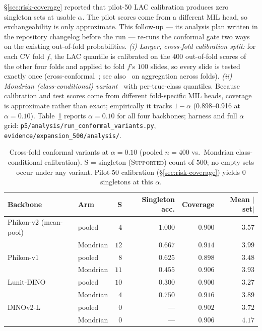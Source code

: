 \documentclass{article}
\newcommand{\SafeNum}[1]{#1}
\begin{document}
\S\ref{sec:risk-coverage} reported that pilot-50 LAC calibration produces zero singleton sets at usable $\alpha$. The pilot scores come from a different MIL head, so exchangeability is only approximate. This follow-up --- its analysis plan written in the repository changelog before the run --- re-runs the conformal gate two ways on the existing out-of-fold probabilities. \emph{(i) Larger, cross-fold calibration split:} for each CV fold $f$, the LAC quantile is calibrated on the $\SafeNum{400}$ out-of-fold scores of the other four folds and applied to fold $f$'s $\SafeNum{100}$ slides, so every slide is tested exactly once (cross-conformal~\citep{vovk2015cross}; see also~\citep{barber2021jackknife} on aggregation across folds). \emph{(ii) Mondrian (class-conditional) variant}~\citep{vovk2005algorithmic,sadinle2019least} with per-true-class quantiles. Because calibration and test scores come from different fold-specific MIL heads, coverage is approximate rather than exact; empirically it tracks $1-\alpha$ (\SafeNum{0.898}--\SafeNum{0.916} at $\alpha{=}\SafeNum{0.10}$). Table~\ref{tab:conformal-variants} reports $\alpha{=}\SafeNum{0.10}$ for all four backbones; harness and full $\alpha$ grid: \texttt{p5/analysis/run\_conformal\_variants.py}, \texttt{evidence/expansion\_500/analysis/}.

\begin{table}[h]
\centering
\caption{Cross-fold conformal variants at $\alpha{=}\SafeNum{0.10}$ (pooled $n{=}\SafeNum{400}$ vs.\ Mondrian class-conditional calibration). S = singleton (\textsc{Supported}) count of $\SafeNum{500}$; no empty sets occur under any variant. Pilot-50 calibration (\S\ref{sec:risk-coverage}) yields $\SafeNum{0}$ singletons at this $\alpha$.}
\label{tab:conformal-variants}
\begin{tabular}{@{}llrrrr@{}}
\toprule
Backbone & Arm & S & Singleton acc. & Coverage & Mean $|$set$|$ \\
\midrule
Phikon-v2 (mean-pool) & pooled   & $\SafeNum{4}$  & $\SafeNum{1.000}$ & $\SafeNum{0.900}$ & $\SafeNum{3.57}$ \\
                      & Mondrian & $\SafeNum{12}$ & $\SafeNum{0.667}$ & $\SafeNum{0.914}$ & $\SafeNum{3.99}$ \\
Phikon-v1             & pooled   & $\SafeNum{8}$  & $\SafeNum{0.625}$ & $\SafeNum{0.898}$ & $\SafeNum{3.48}$ \\
                      & Mondrian & $\SafeNum{11}$ & $\SafeNum{0.455}$ & $\SafeNum{0.906}$ & $\SafeNum{3.93}$ \\
Lunit-DINO            & pooled   & $\SafeNum{10}$ & $\SafeNum{0.300}$ & $\SafeNum{0.900}$ & $\SafeNum{3.27}$ \\
                      & Mondrian & $\SafeNum{4}$  & $\SafeNum{0.750}$ & $\SafeNum{0.916}$ & $\SafeNum{3.89}$ \\
DINOv2-L              & pooled   & $\SafeNum{0}$  & ---               & $\SafeNum{0.902}$ & $\SafeNum{3.72}$ \\
                      & Mondrian & $\SafeNum{0}$  & ---               & $\SafeNum{0.906}$ & $\SafeNum{4.17}$ \\
\bottomrule
\end{tabular}
\end{table}
\end{document}

